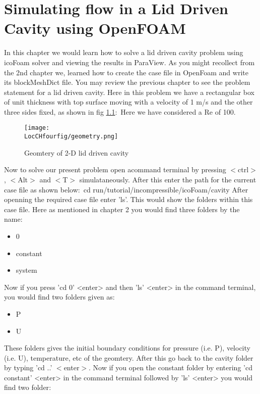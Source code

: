 \chapter{Simulating flow in a Lid Driven Cavity using OpenFOAM}
\thispagestyle{empty}
\label{sec:chap4}
\newcommand{\LocCHfourfig}{\Origin/CHAPTERS/chap4/figures}


In this chapter we would learn how to solve a lid driven cavity problem using icoFoam solver and viewing the results in ParaView. As you might recollect from the 2nd chapter we, learned how to create the case file in OpenFoam and write its blockMeshDict file.
You may review the previous chapter to see the problem statement for a lid driven cavity. Here in this problem we have a rectangular box of unit thickness with top surface moving with a velocity of 1 m/s and the other three sides fixed, as shown in fig \ref{geometry}$:$ 
Here we have considered a Re of 100.

\begin{figure}[ht]  
\begin{center}  
\texttt{[image: \\LocCHfourfig/geometry.png]}
\caption{Geomtery of 2-D lid driven cavity}
\label{geometry}
\end{center}  
\end{figure}

\flushleft Now to solve our present problem open acommand terminal by pressing $<$ctrl$>$, $<$Alt$>$ and $<$T$>$ simulataneously. After this enter the path for the current case file as shown below$:$
\flushleft cd run/tutorial/incompressible/icoFoam/cavity
\flushleft After openning the required case file enter 'ls'. This would show the folders within this case file. Here as mentioned in chapter 2 you would find three folders by the name$:$

\begin{itemize}
  \item 0
  \item constant
  \item system
\end{itemize}

\flushleft Now if you press 'cd 0' <enter> and then 'ls' <enter> in the command terminal, you would find two folders given as$:$

\begin{itemize}
  \item P
  \item U
\end{itemize}

\flushleft These folders gives the initial boundary conditions for pressure (i.e. P), velocity (i.e. U), temperature, etc of the geomtery. After this go back to the cavity folder by typing 'cd ..' $<$enter$>$.
\flushleft Now if you open the constant folder by entering 'cd constant' <enter> in the command terminal followed by 'ls' <enter> you would find two folder$:$

